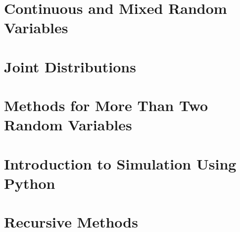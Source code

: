 \documentclass[11pt]{book}
\begin{document}
\chapter{Continuous and Mixed Random Variables}


\chapter{Joint Distributions}


\chapter{Methods for More Than Two Random Variables}


\chapter{Introduction to Simulation Using Python}


\chapter{Recursive Methods}

\end{document}
